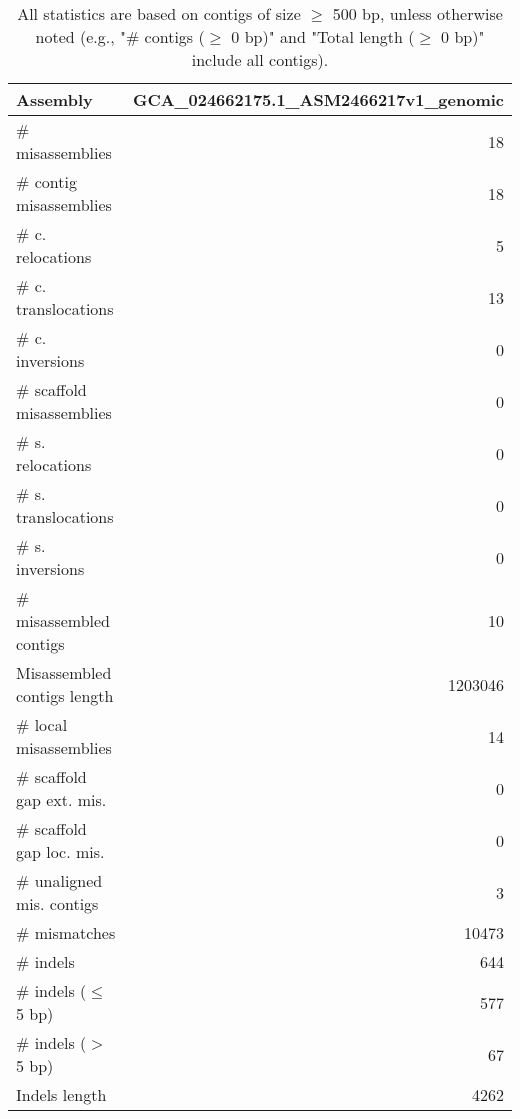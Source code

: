 \documentclass[12pt,a4paper]{article}
\begin{document}
\begin{table}[ht]
\begin{center}
\caption{All statistics are based on contigs of size $\geq$ 500 bp, unless otherwise noted (e.g., "\# contigs ($\geq$ 0 bp)" and "Total length ($\geq$ 0 bp)" include all contigs).}
\begin{tabular}{|l*{1}{|r}|}
\hline
Assembly & GCA\_024662175.1\_ASM2466217v1\_genomic \\ \hline
\# misassemblies & 18 \\ \hline
\hspace{2mm}\# contig misassemblies & 18 \\ \hline
\hspace{5mm}\# c. relocations & 5 \\ \hline
\hspace{5mm}\# c. translocations & 13 \\ \hline
\hspace{5mm}\# c. inversions & 0 \\ \hline
\hspace{2mm}\# scaffold misassemblies & 0 \\ \hline
\hspace{5mm}\# s. relocations & 0 \\ \hline
\hspace{5mm}\# s. translocations & 0 \\ \hline
\hspace{5mm}\# s. inversions & 0 \\ \hline
\# misassembled contigs & 10 \\ \hline
Misassembled contigs length & 1203046 \\ \hline
\# local misassemblies & 14 \\ \hline
\# scaffold gap ext. mis. & 0 \\ \hline
\# scaffold gap loc. mis. & 0 \\ \hline
\# unaligned mis. contigs & 3 \\ \hline
\# mismatches & 10473 \\ \hline
\# indels & 644 \\ \hline
\hspace{5mm}\# indels ($\leq$ 5 bp) & 577 \\ \hline
\hspace{5mm}\# indels ($>$ 5 bp) & 67 \\ \hline
Indels length & 4262 \\ \hline
\end{tabular}
\end{center}
\end{table}
\end{document}
